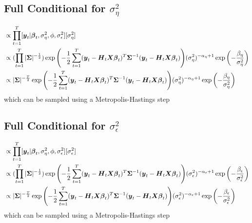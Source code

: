 \documentclass[fleqn]{article}
\def\bm#1{\mbox{\boldmath $#1$}}
\begin{document}
\subsection{Full Conditional for $\sigma^2_\eta$}
%
\begin{align*}
[\sigma^2_\eta | \cdot] & \propto \prod_{t = 1}^T [\bm{y}_t | \bm{\beta}_t, \sigma^2_\eta, \phi, \sigma^2_\epsilon] [\sigma^2_\eta]\\
%
& \propto (\prod_{t = 1}^T |\bm{\Sigma} |^{ - \frac{1} {2}}) \exp{ \left( - \frac{1} {2} \sum_{t = 1}^T (\bm{y}_t - \bm{H}_t \bm{X} \bm{\beta}_t)^T \bm{\Sigma}^{ - 1} (\bm{y}_t - \bm{H}_t \bm{X} \bm{\beta}_t) \right) } (\sigma^2_\eta)^{ - \alpha_\eta + 1} \exp{ \left( - \frac{\beta_\eta} {\sigma^2_\eta} \right) }\\
%
& \propto |\bm{\Sigma} |^{ - \frac{T} {2}} \exp{ \left( - \frac{1} {2} \sum_{t = 1}^T (\bm{y}_t - \bm{H}_t \bm{X} \bm{\beta}_t)^T \bm{\Sigma}^{ - 1} (\bm{y}_t - \bm{H}_t \bm{X} \bm{\beta}_t) \right) } (\sigma^2_\eta)^{ - \alpha_\eta + 1} \exp{ \left( - \frac{\beta_\eta} {\sigma^2_\eta} \right) }\\
\end{align*}
% 
which can be sampled using a Metropolis-Hastings step
%
\subsection{Full Conditional for $\sigma^2_\epsilon$}
%
\begin{align*}
[\sigma^2_\epsilon | \cdot] & \propto \prod_{t = 1}^T [\bm{y}_t | \bm{\beta}_t, \sigma^2_\eta, \phi, \sigma^2_\epsilon] [\sigma^2_\epsilon]\\
%
& \propto (\prod_{t = 1}^T |\bm{\Sigma} |^{ - \frac{1} {2}}) \exp{ \left( - \frac{1} {2} \sum_{t = 1}^T (\bm{y}_t - \bm{H}_t \bm{X} \bm{\beta}_t)^T \bm{\Sigma}^{ - 1} (\bm{y}_t - \bm{H}_t \bm{X} \bm{\beta}_t) \right) } (\sigma^2_\epsilon)^{ - \alpha_\epsilon + 1} \exp{ \left( - \frac{\beta_\epsilon} {\sigma^2_\epsilon} \right) }\\
%
& \propto |\bm{\Sigma} |^{ - \frac{T} {2}} \exp{ \left( - \frac{1} {2} \sum_{t = 1}^T (\bm{y}_t - \bm{H}_t \bm{X} \bm{\beta}_t)^T \bm{\Sigma}^{ - 1} (\bm{y}_t - \bm{H}_t \bm{X} \bm{\beta}_t) \right) } (\sigma^2_\epsilon)^{ - \alpha_\epsilon + 1} \exp{ \left( - \frac{\beta_\epsilon} {\sigma^2_\epsilon} \right) }\\
\end{align*}
% 
which can be sampled using a Metropolis-Hastings step
%
\end{document}
